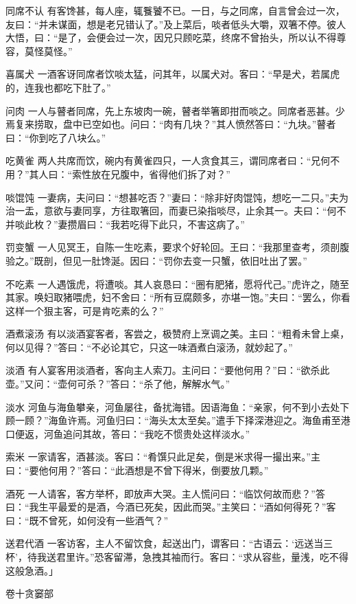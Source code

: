 \documentclass[12pt,UTF8]{ctexbook}
\begin{document}
同席不认
有客馋甚，每人座，辄餮饕不已。一日，与之同席，自言曾会过一次，友曰：“并未谋面，想是老兄错认了。”及上菜后，啖者低头大嚼，双箸不停。彼人大悟，曰：“是了，会便会过一次，因兄只顾吃菜，终席不曾抬头，所以认不得尊容，莫怪莫怪。”

喜属犬
一酒客讶同席者饮啖太猛，问其年，以属犬对。客曰：“早是犬，若属虎的，连我也都吃下肚了。”

问肉
一人与瞽者同席，先上东坡肉一碗，瞽者举箸即拑而啖之。同席者恶甚。少焉复来捞取，盘中已空如也。问曰：“肉有几块？”其人愤然答曰：“九块。”瞽者曰：“你到吃了八块么。”

吃黄雀
两人共席而饮，碗内有黄雀四只，一人贪食其三，谓同席者曰：“兄何不用？”其人曰：“索性放在兄腹中，省得他们拆了对？”

啖馄饨
一妻病，夫问曰：“想甚吃否？”妻曰：“除非好肉馄饨，想吃一二只。”夫为治一盂，意欲与妻同享，方往取箸回，而妻已染指啖尽，止余其一。夫曰：“何不并啖此枚？”妻攒眉曰：“我若吃得下此只，不害这病了。”

罚变蟹
一人见冥王，自陈一生吃素，要求个好轮回。王曰：“我那里查考，须剖腹验之。”既剖，但见一肚馋涎。因曰：“罚你去变一只蟹，依旧吐出了罢。”

不吃素
一人遇饿虎，将遭啖。其人哀恳曰：“圈有肥猪，愿将代己。”虎许之，随至其家。唤妇取猪喂虎，妇不舍曰：“所有豆腐颇多，亦堪一饱。”夫曰：“罢么，你看这样一个狠主客，可是肯吃素的么？”

酒煮滚汤
有以淡酒宴客者，客尝之，极赞府上烹调之美。主曰：“粗肴未曾上桌，何以见得？”答曰：“不必论其它，只这一味酒煮白滚汤，就妙起了。”

淡酒
有人宴客用淡酒者，客向主人索刀。主问曰：“要他何用？”曰：“欲杀此壶。”又问：“壶何可杀？”答曰：“杀了他，解解水气。”

淡水
河鱼与海鱼攀亲，河鱼屡往，备扰海错。因语海鱼：“亲家，何不到小去处下顾一顾？”海鱼许焉。河鱼归曰：“海头太太至矣。”遣手下择深港迎之。海鱼甫至港口便返，河鱼追问其故，答曰：“我吃不惯贵处这样淡水。”

索米
一家请客，酒甚淡。客曰：“肴馔只此足矣，倒是米求得一撮出来。”主曰：“要他何用？”答曰：“此酒想是不曾下得米，倒要放几颗。”

酒死
一人请客，客方举杯，即放声大哭。主人慌问曰：“临饮何故而悲？”答曰：“我生平最爱的是酒，今酒已死矣，因此而哭。”主笑曰：“酒如何得死？”客曰：“既不曾死，如何没有一些酒气？”

送君代酒
一客访客，主人不留饮食，起送出门，谓客曰：“古语云：‘远送当三杯’，待我送君里许。”恐客留滞，急拽其袖而行。客曰：“求从容些，量浅，吃不得这般急酒。」

卷十贪窭部
\end{document}
